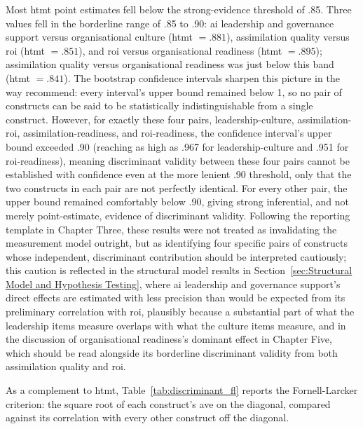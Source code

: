 Most \gls{htmt} point estimates fell below the strong-evidence threshold of .85. Three values fell in the borderline range of .85 to .90: \gls{ai} leadership and governance support versus organisational culture (\gls{htmt} $= .881$), assimilation quality versus \gls{roi} (\gls{htmt} $= .851$), and \gls{roi} versus organisational readiness (\gls{htmt} $= .895$); assimilation quality versus organisational readiness was just below this band (\gls{htmt} $= .841$). The bootstrap confidence intervals sharpen this picture in the way \textcite{Hair2019} recommend: every interval's upper bound remained below 1, so no pair of constructs can be said to be statistically indistinguishable from a single construct. However, for exactly these four pairs, leadership-culture, assimilation-\gls{roi}, assimilation-readiness, and \gls{roi}-readiness, the confidence interval's upper bound exceeded .90 (reaching as high as .967 for leadership-culture and .951 for \gls{roi}-readiness), meaning discriminant validity between these four pairs cannot be established with confidence even at the more lenient .90 threshold, only that the two constructs in each pair are not perfectly identical. For every other pair, the upper bound remained comfortably below .90, giving strong inferential, and not merely point-estimate, evidence of discriminant validity. Following the reporting template in Chapter Three, these results were not treated as invalidating the measurement model outright, but as identifying four specific pairs of constructs whose independent, discriminant contribution should be interpreted cautiously; this caution is reflected in the structural model results in Section~\ref{sec:Structural Model and Hypothesis Testing}, where \gls{ai} leadership and governance support's direct effects are estimated with less precision than would be expected from its preliminary correlation with \gls{roi}, plausibly because a substantial part of what the leadership items measure overlaps with what the culture items measure, and in the discussion of organisational readiness's dominant effect in Chapter Five, which should be read alongside its borderline discriminant validity from both assimilation quality and \gls{roi}.

As a complement to \gls{htmt}, Table~\ref{tab:discriminant_fl} reports the Fornell-Larcker criterion: the square root of each construct's \gls{ave} on the diagonal, compared against its correlation with every other construct off the diagonal.

